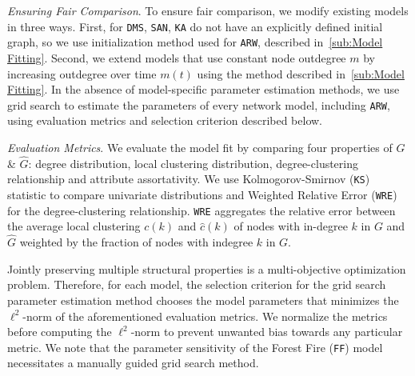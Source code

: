\textit{Ensuring Fair Comparison}. To ensure fair comparison, we modify existing models in three ways.
First, for \texttt{DMS}, \texttt{SAN}, \texttt{KA} do not have an explicitly defined initial graph,
so we use initialization method used for \texttt{ARW}, described in~\cref{sub:Model Fitting}. Second, we extend
models that use constant node outdegree $m$ by increasing outdegree over time $m(t)$
using the method described in~\cref{sub:Model Fitting}. In the absence of model-specific parameter estimation methods,
we use grid search to estimate the parameters of every network model, including \texttt{ARW},
using evaluation metrics and selection criterion described below.

\textit{Evaluation Metrics}.
We evaluate the model fit by comparing four properties of ${G}$ \& $\hat{G}$:
degree distribution, local clustering distribution, degree-clustering relationship
and attribute assortativity. We use Kolmogorov-Smirnov (\texttt{KS}) statistic to compare univariate
distributions and Weighted Relative Error (\texttt{WRE}) for the degree-clustering relationship.
\texttt{WRE} aggregates the relative error between the average local clustering $c(k)$ and $\hat{c}(k)$ of nodes with in-degree $k$ in $G$ and $\hat{G}$ weighted by the fraction of nodes with indegree $k$ in $G$.


Jointly preserving multiple structural properties is a multi-objective optimization
problem.
Therefore, for each model, the selection criterion for the grid search parameter estimation method
chooses the model parameters that minimizes the $\ell^2$-norm of the aforementioned evaluation metrics.
We normalize the metrics before computing the $\ell^2$-norm
to prevent unwanted bias towards any particular metric.
We note that the parameter sensitivity of the Forest Fire (\texttt{FF}) model necessitates
a manually guided grid search method.

